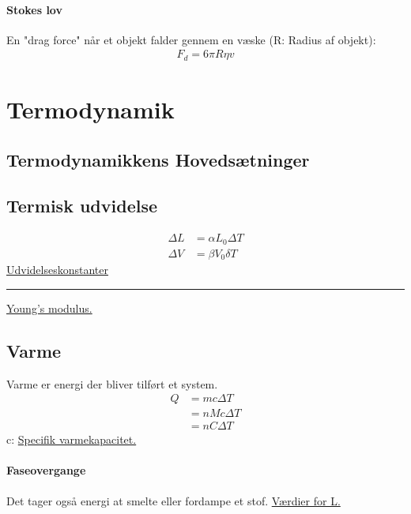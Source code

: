 \documentclass[a4paper,oneside,article]{memoir}
\begin{document}
\subsubsection{Stokes lov} \label{sssc:stokeslov}
En "drag force" når et objekt falder gennem en væske (R: Radius af objekt): 
\begin{align*}
    F_d=6\pi R\eta v
\end{align*}

\newpage
\chapter{Termodynamik} \label{ch:termodynamik}
\section{Termodynamikkens Hovedsætninger} 

\section{Termisk udvidelse} \label{sc:termiskudvidelse}
\begin{align*}
    \Delta L &= \alpha L_0 \Delta T \\
    \Delta V &= \beta V_0 \delta T
\end{align*}
\hyperref[fig:termiskudvidelse]{Udvidelseskonstanter}
\plainbreak{1}
\hyperref[fig:youngsmodulus]{Young's modulus.}

\newpage
\section{Varme} \label{sc:varme}
Varme er energi der bliver tilført et system. 
\begin{align*}
    Q &= mc\Delta T \\
    &= nMc\Delta T \\
    &= nC\Delta T
\end{align*}
c: \hyperref[fig:varmekapacitet1]{Specifik varmekapacitet.} 

\newpage
\subsubsection{Faseovergange} \label{sssc:faseovergange}
Det tager også energi at smelte eller fordampe et stof. 
\hyperref[fig:faseovergange2]{Værdier for L.}
\end{document}
